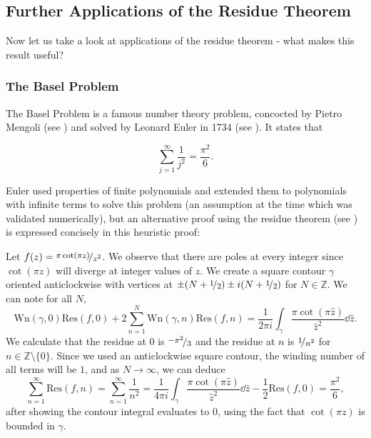 \documentclass[a4paper]{article}
\newenvironment{hproof}{%
  \renewcommand{\proofname}{Heuristic Proof}\proof}{\endproof}
\def\nicefrac#1#2{%
    \raise.5ex\hbox{\begin{footnotesize}$#1$\end{footnotesize}}%
    \kern-.15em/\kern-.035em%
    \lower.25ex\hbox{\begin{footnotesize}$#2$\end{footnotesize}}}
\def\Res{\text{Res}}
\def\Wind{\text{Wn}}
\begin{document}
\subsection{Further Applications of the Residue Theorem}

Now let us take a look at applications of the residue theorem - what makes this result useful?


\subsubsection{The Basel Problem}

The Basel Problem is a famous number theory problem, concocted by Pietro Mengoli (see \citep[p.1071]{BaselHist}) and solved by Leonard Euler in 1734 (see \citep[p.1067-1069]{BaselHist}). It states that

\[\sum_{j=1}^{\infty} \frac{1}{j^{2}} = \frac{\pi ^ {2}}{6}. \]



Euler used properties of finite polynomials and extended them to polynomials with infinite terms to solve this problem (an assumption at the time which was validated numerically), but an alternative proof using the residue theorem (see \citep[p.1, 6-7]{Basel}) is expressed concisely in this heuristic proof:
 
\begin{hproof}
Let $f(z) = \nicefrac{\pi \cot (\pi z)}{z^{2}}$. We observe that there are poles at every integer since $\cot (\pi z)$ will diverge at integer values of $z$. We create a square contour $\gamma$ oriented anticlockwise with vertices at $\pm (N+ \nicefrac{1}{2}) \pm i (N+ \nicefrac{1}{2})$ for $N \in \mathbb{Z}$.
We can note for all $N$, 
\[ \Wind (\gamma,0) \Res (f,0) + 2 \sum_{n=1}^{N} \Wind (\gamma,n) \Res (f,n) = \frac{1}{2 \pi i}\int_\gamma { \frac{\pi \cot (\pi \hat{z})}{\hat{z}^{2}} \dd\hat{z}}.\]
We calculate that the residue at $0$ is $\nicefrac{-\pi ^ {2}}{3}$ and the residue at $n$ is $\nicefrac{1}{n^{2}}$ for $n \in \mathbb{Z} \setminus \{0\}$. Since we used an anticlockwise square contour, the winding number of all terms will be $1$, and as $N \to \infty$, we can deduce
\[\sum_{n=1}^{\infty} \Res (f,n) = \sum_{n=1}^{\infty} \frac{1}{n^{2}} = \frac{1}{4 \pi i}\int_\gamma { \frac{\pi \cot (\pi \hat{z})}{\hat{z}^{2}} \dd\hat{z}} - \frac{1}{2} \Res (f,0) = \frac{\pi ^ {2}}{6}, \]
after showing the contour integral evaluates to $0$, using the fact that $\cot(\pi z)$ is bounded in $\gamma$.
\end{hproof}
\end{document}
